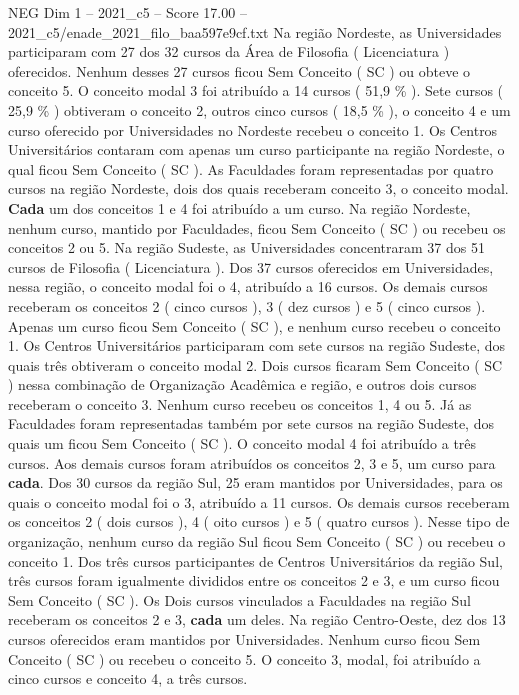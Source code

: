 \begin{textsample}{NEG Dim 1 – 2021\_c5 – Score 17.00 – 2021\_c5/enade\_2021\_filo\_baa597e9cf.txt}
Na região Nordeste, as Universidades participaram com 27 dos 32 cursos da Área de Filosofia ( Licenciatura ) oferecidos.
Nenhum desses 27 cursos ficou Sem Conceito ( SC ) ou obteve o conceito 5.
O conceito modal 3 foi atribuído a 14 cursos ( 51,9 \% ).
Sete cursos ( 25,9 \% ) obtiveram o conceito 2, outros cinco cursos ( 18,5 \% ), o conceito 4 e um curso oferecido por Universidades no Nordeste recebeu o conceito 1.
Os Centros Universitários contaram com apenas um curso participante na região Nordeste, o qual ficou Sem Conceito ( SC ).
As Faculdades foram representadas por quatro cursos na região Nordeste, dois dos quais receberam conceito 3, o conceito modal. \textbf{Cada} um dos conceitos 1 e 4 foi atribuído a um curso.
Na região Nordeste, nenhum curso, mantido por Faculdades, ficou Sem Conceito ( SC ) ou recebeu os conceitos 2 ou 5.
Na região Sudeste, as Universidades concentraram 37 dos 51 cursos de Filosofia ( Licenciatura ).
Dos 37 cursos oferecidos em Universidades, nessa região, o conceito modal foi o 4, atribuído a 16 cursos.
Os demais cursos receberam os conceitos 2 ( cinco cursos ), 3 ( dez cursos ) e 5 ( cinco cursos ).
Apenas um curso ficou Sem Conceito ( SC ), e nenhum curso recebeu o conceito 1.
Os Centros Universitários participaram com sete cursos na região Sudeste, dos quais três obtiveram o conceito modal 2.
Dois cursos ficaram Sem Conceito ( SC ) nessa combinação de Organização Acadêmica e região, e outros dois cursos receberam o conceito 3.
Nenhum curso recebeu os conceitos 1, 4 ou 5.
Já as Faculdades foram representadas também por sete cursos na região Sudeste, dos quais um ficou Sem Conceito ( SC ).
O conceito modal 4 foi atribuído a três cursos.
Aos demais cursos foram atribuídos os conceitos 2, 3 e 5, um curso para \textbf{cada}.
Dos 30 cursos da região Sul, 25 eram mantidos por Universidades, para os quais o conceito modal foi o 3, atribuído a 11 cursos.
Os demais cursos receberam os conceitos 2 ( dois cursos ), 4 ( oito cursos ) e 5 ( quatro cursos ).
Nesse tipo de organização, nenhum curso da região Sul ficou Sem Conceito ( SC ) ou recebeu o conceito 1.
Dos três cursos participantes de Centros Universitários da região Sul, três cursos foram igualmente divididos entre os conceitos 2 e 3, e um curso ficou Sem Conceito ( SC ).
Os Dois cursos vinculados a Faculdades na região Sul receberam os conceitos 2 e 3, \textbf{cada} um deles.
Na região Centro-Oeste, dez dos 13 cursos oferecidos eram mantidos por Universidades.
Nenhum curso ficou Sem Conceito ( SC ) ou recebeu o conceito 5.
O conceito 3, modal, foi atribuído a cinco cursos e conceito 4, a três cursos.

\end{textsample}
